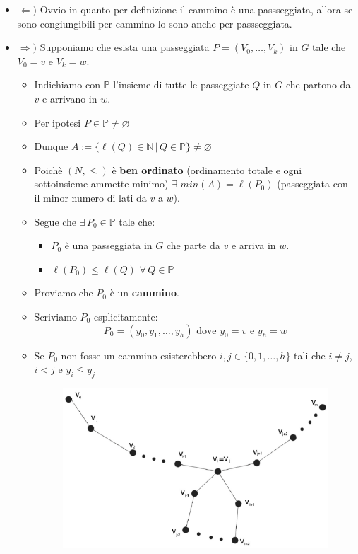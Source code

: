 \documentclass[10pt]{article}
\begin{document}
\begin{itemize}
\item
$\Leftarrow)$ Ovvio in quanto per definizione il cammino è una passseggiata, allora se sono congiungibili per cammino lo sono anche per passseggiata.
\item
$\Rightarrow)$ Supponiamo che esista una passeggiata $P = (V_0, \dotso, V_k)$ in $G$ tale che $V_0 = v$ e $V_k = w$.
\begin{itemize}
\item
Indichiamo con $\mathbb{P}$ l'insieme di tutte le passeggiate $Q$ in $G$ che partono da $v$ e arrivano in $w$.
\item
Per ipotesi $P \in \mathbb{P} \neq \varnothing$
\item
Dunque $A := \{\ell(Q) \in \mathbb{N} \,|\, Q \in \mathbb{P}\} \neq \varnothing$
\item
Poichè $(N,\leq)$ è \textbf{ben ordinato} (ordinamento totale e ogni sottoinsieme ammette minimo) $\exists \,\,min(A) = \ell(P_0)$ (passeggiata con il minor numero di lati da $v$ a $w$).
\item
Segue che $\exists \,P_0 \in \mathbb{P}$ tale che:
\begin{itemize}
\item
$P_0$ è una passeggiata in $G$ che parte da $v$ e arriva in $w$.
\item
$\ell(P_0) \leq \ell(Q) \,\,\forall \,Q \in \mathbb{P}$
\end{itemize}
\item
Proviamo che $P_0$ è un \textbf{cammino}.
\item
Scriviamo $P_0$ esplicitamente:
$$P_0 = (y_0, y_1, \dotso, y_h) \textrm{ dove } y_0 = v \textrm{ e } y_h = w$$
\item
Se $P_0$ non fosse un cammino esisterebbero $i,j \in \{0,1,\dotso,h\}$ tali che $i \neq j$, $i < j$ e $y_i \leq y_j$
\begin{center}
\begin{figure}[h]
\centering
\includegraphics[width = 0.7\linewidth]{CongiungibilitaPasseggiataCammini.PNG}

\end{figure}
\end{center}
\end{itemize}
\end{itemize}
\end{document}
